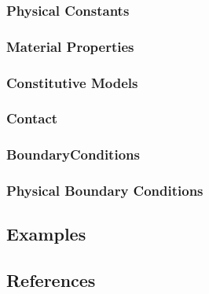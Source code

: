 \subsubsection{Physical Constants}
\subsubsection{Material Properties}
\subsubsection{Constitutive Models}
\subsubsection{Contact}
\subsubsection{BoundaryConditions}
\subsubsection{Physical Boundary Conditions}

\subsection{Examples}

\subsection{References}

